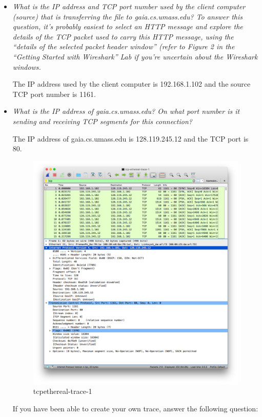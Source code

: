 \documentclass[11pt]{article}
\begin{document}
\begin{itemize}
	\setlength\itemsep{.5cm}

	\item
		\textit{What is the IP address and TCP port number used by the client computer (source) that is transferring the file to gaia.cs.umass.edu? To answer this question, it’s probably easiest to select an HTTP message and explore the details of the TCP packet used to carry this HTTP message, using the “details of the selected packet header window” (refer to Figure 2 in the “Getting Started with Wireshark” Lab if you’re uncertain about the Wireshark windows.}
		\par The IP address used by the client computer is 192.168.1.102 and the source TCP port number is 1161.
	
	\item
		\textit{What is the IP address of gaia.cs.umass.edu? On what port number is it sending and receiving TCP segments for this connection?}
		\par The IP address of gaia.cs.umass.edu is 128.119.245.12 and the TCP port is 80.
		
		\begin{figure}[H]
		\centering
		\caption{tcpethereal-trace-1}
		\includegraphics[width=400px]{01}
		\end{figure}
	
\par If you have been able to create your own trace, answer the following question:


\end{itemize}
\end{document}
